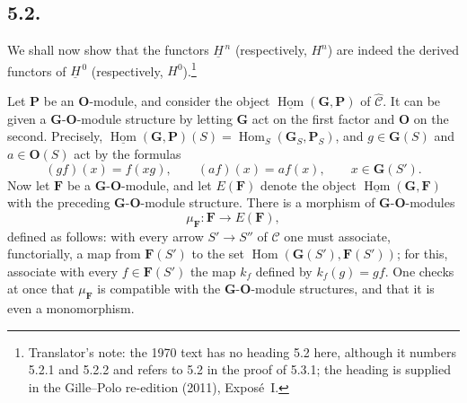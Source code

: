 \subsection*{5.2.}

We shall now show that
the functors \(\underline H^{\,n}\) (respectively, \(H^n\)) are indeed the
derived functors of \(\underline H^{\,0}\) (respectively, \(H^0\)).\footnote{Translator's note: the 1970 text has no heading 5.2 here, although it
numbers 5.2.1 and 5.2.2 and refers to 5.2 in the proof of 5.3.1; the heading
is supplied in the Gille--Polo re-edition (2011), Exposé~I.}

Let \(\mathbf P\) be an \(\mathbf O\)-module, and consider the object
\(\underline{\operatorname{Hom}}(\mathbf G,\mathbf P)\) of
\(\widehat{\mathscr C}\). It can be given a
\(\mathbf G\)-\(\mathbf O\)-module structure by letting \(\mathbf G\) act on
the first factor and \(\mathbf O\) on the second. Precisely,
\(\underline{\operatorname{Hom}}(\mathbf G,\mathbf P)(S)
=\operatorname{Hom}_S(\mathbf G_S,\mathbf P_S)\), and \(g\in\mathbf G(S)\)
and \(a\in\mathbf O(S)\) act by the formulas
\[
  (gf)(x)=f(xg),
  \qquad
  (af)(x)=af(x),
  \qquad x\in\mathbf G(S').
\]
Now let \(\mathbf F\) be a \(\mathbf G\)-\(\mathbf O\)-module, and let
\(E(\mathbf F)\) denote the object
\(\underline{\operatorname{Hom}}(\mathbf G,\mathbf F)\) with the preceding
\(\mathbf G\)-\(\mathbf O\)-module structure. There is a morphism of
\(\mathbf G\)-\(\mathbf O\)-modules
\[
  \mu_{\mathbf F}:\mathbf F\longrightarrow E(\mathbf F),
\]
defined as follows: with every arrow \(S'\to S''\) of \(\mathscr C\) one
must associate, functorially, a map from \(\mathbf F(S')\) to the set
\(\operatorname{Hom}(\mathbf G(S'),\mathbf F(S'))\); for this, associate
with every \(f\in\mathbf F(S')\) the map \(k_f\) defined by
\(k_f(g)=gf\). One checks at once that \(\mu_{\mathbf F}\) is compatible
with the \(\mathbf G\)-\(\mathbf O\)-module structures, and that it is even
a monomorphism.

